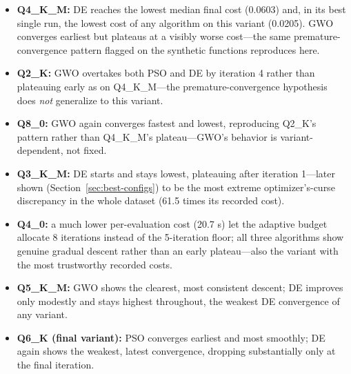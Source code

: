 \documentclass[conference, letterpaper]{IEEEtran}
\begin{document}
\begin{itemize}
  \item \textbf{Q4\_K\_M:} DE reaches the lowest median final cost (0.0603) and, in its best single run, the lowest cost of any algorithm on this variant (0.0205). GWO converges earliest but plateaus at a visibly worse cost---the same premature-convergence pattern flagged on the synthetic functions reproduces here.
  \item \textbf{Q2\_K:} GWO overtakes both PSO and DE by iteration 4 rather than plateauing early as on Q4\_K\_M---the premature-convergence hypothesis does \emph{not} generalize to this variant.
  \item \textbf{Q8\_0:} GWO again converges fastest and lowest, reproducing Q2\_K's pattern rather than Q4\_K\_M's plateau---GWO's behavior is variant-dependent, not fixed.
  \item \textbf{Q3\_K\_M:} DE starts and stays lowest, plateauing after iteration 1---later shown (Section~\ref{sec:best-configs}) to be the most extreme optimizer's-curse discrepancy in the whole dataset (61.5 times its recorded cost).
  \item \textbf{Q4\_0:} a much lower per-evaluation cost (20.7 s) let the adaptive budget allocate 8 iterations instead of the 5-iteration floor; all three algorithms show genuine gradual descent rather than an early plateau---also the variant with the most trustworthy recorded costs.
  \item \textbf{Q5\_K\_M:} GWO shows the clearest, most consistent descent; DE improves only modestly and stays highest throughout, the weakest DE convergence of any variant.
  \item \textbf{Q6\_K (final variant):} PSO converges earliest and most smoothly; DE again shows the weakest, latest convergence, dropping substantially only at the final iteration.
\end{itemize}
\end{document}
